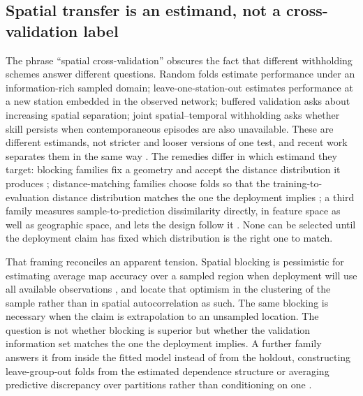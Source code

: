 \subsection{Spatial transfer is an estimand, not a cross-validation label}

The phrase ``spatial cross-validation'' obscures the fact that different withholding schemes answer
different questions. Random folds estimate performance under an information-rich sampled domain;
leave-one-station-out estimates performance at a new station embedded in the observed network;
buffered validation asks about increasing spatial separation; joint spatial--temporal withholding
asks whether skill persists when contemporaneous episodes are also unavailable. These are different
estimands, not stricter and looser versions of one test, and recent work separates them in the same
way \citep{jiang2026tiered,pompili2026,portes2026}. The remedies differ in which estimand they
target: blocking families fix a geometry and accept the distance distribution it produces
\citep{valavi2019blockcv,schratz2019,schratz2024mlr3}; distance-matching families choose folds so
that the training-to-evaluation distance distribution matches the one the deployment implies
\citep{mila2022nndm,linnenbrink2024knndm}; a third family measures sample-to-prediction
dissimilarity directly, in feature space as well as geographic space, and lets the design follow it
\citep{wang2023spatialplus,wang2025adversarial,wang2025dissimilarity,linnenbrink2026beyond}. None
can be selected until the deployment claim has fixed which distribution is the right one to match.

That framing reconciles an apparent tension. Spatial blocking is pessimistic for estimating average
map accuracy over a sampled region when deployment will use all available observations
\citep{wadoux2021}, and \citet{debruin2022clustered} locate that optimism in the clustering of the
sample rather than in spatial autocorrelation as such. The same blocking is necessary when the
claim is extrapolation to an unsampled location. The question is not whether blocking is superior
but whether the validation information set matches the one the deployment implies. A further family
answers it from inside the fitted model instead of from the holdout, constructing leave-group-out
folds from the estimated dependence structure \citep{adin2024lgocv} or averaging predictive
discrepancy over partitions rather than conditioning on one \citep{lobo2020bayescv}.

